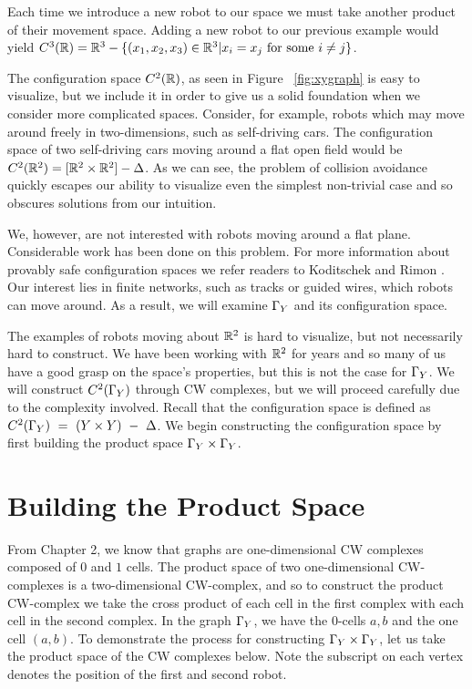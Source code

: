Each time we introduce a new robot to our space we must take another product of their movement space. Adding a new robot to our previous example would yield $C^3(\mathbb{R})=\mathbb{R}^3 - \{(x_1,x_2,x_3)\in \mathbb{R}^3|x_i=x_j \text{ for some } i \neq j\}$. 

The configuration space $C^2(\mathbb{R})$, as seen in Figure~
\ref{fig:xygraph} is easy to visualize, but we include it in order to give us a solid foundation when we consider more complicated spaces. Consider, for example,  robots which may move around freely in two-dimensions, such as self-driving cars. The configuration space of two self-driving cars moving around a flat open field would be $C^2(\mathbb{R}^2)= [\mathbb{R}^2 \times \mathbb{R}^2]-\Delta$. As we can see, the problem of collision avoidance quickly escapes our ability to visualize even the simplest non-trivial case and so obscures solutions from our intuition. 

We, however, are not interested with robots moving around a flat plane. Considerable work has been done on this problem. For more information about provably safe configuration spaces we refer readers to Koditschek and Rimon \cite{safe}. Our interest lies in finite networks, such as tracks or guided wires, which robots can move around. As a result, we will examine $\Gamma_Y$ and its configuration space.

The examples of robots moving about $\mathbb{R}^2$ is hard to visualize, but not necessarily hard to construct. We have been working with $\mathbb{R}^2$ for years and so many of us have a good grasp on the space's properties, but this is not the case for $\Gamma_Y$. We will construct $C^2(\Gamma_Y)$ through CW complexes, but we will proceed carefully due to the complexity involved. Recall that the configuration space is defined as $C^2(\Gamma_Y)~=~(Y\times Y)~-~\Delta$. We begin constructing the configuration space by first building the product space $\Gamma_Y \times \Gamma_Y$.

\section{Building the Product Space}

From Chapter 2, we know that graphs are one-dimensional CW complexes composed of $0$ and $1$ cells. The product space of two one-dimensional CW-complexes is a two-dimensional CW-complex, and so to construct the product CW-complex we take the cross product of each cell in the first complex with each cell in the second complex. In the graph $\Gamma_Y$, we have the $0$-cells $a,b$ and the one cell $(a,b)$. To demonstrate the process for constructing $\Gamma_Y \times \Gamma_Y$, let us take the product space of the CW complexes below. Note the subscript on each vertex denotes the position of the first and second robot. 

